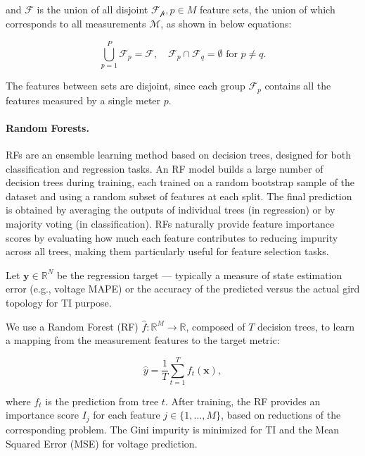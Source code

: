 \documentclass[journal]{IEEEtran}  %
\begin{document}
and $\mathcal{F}$ is the union of all disjoint $\mathcal{F_p}, p \in M$ feature sets, the union of which corresponds to all measurements $\mathcal{M}$, as shown in below equations:

\begin{equation}
\label{eq:Union of Feature Groups}
\bigcup_{p=1}^P \mathcal{F}_p = \mathcal{F}, \quad \mathcal{F}_p \cap \mathcal{F}_q = \emptyset \text{ for } p \neq q.
\end{equation}


The features between sets are disjoint, since each group $\mathcal{F}_p$ contains all the features measured by a single meter $p$.

\paragraph{Random Forests.}

RFs are an ensemble learning method based on decision trees, designed for both classification and regression tasks. An RF model builds a large number of decision trees during training, each trained on a random bootstrap sample of the dataset and using a random subset of features at each split. The final prediction is obtained by averaging the outputs of individual trees (in regression) or by majority voting (in classification). RFs naturally provide feature importance scores by evaluating how much each feature contributes to reducing impurity across all trees, making them particularly useful for feature selection tasks.

Let $\mathbf{y} \in \mathbb{R}^N$ be the regression target — typically a measure of state estimation error (e.g., voltage MAPE) or the accuracy of the predicted versus the actual gird topology for TI purpose.

We use a Random Forest (RF) $\hat{f}: \mathbb{R}^M \rightarrow \mathbb{R}$, composed of $T$ decision trees, to learn a mapping from the measurement features to the target metric:

\begin{equation}
\label{eq:Ensamble Prediction}
\hat{y} = \frac{1}{T} \sum_{t=1}^{T} f_t(\mathbf{x}),
\end{equation}

where $f_t$ is the prediction from tree $t$. After training, the RF provides an importance score $I_j$ for each feature $j \in \{1, \ldots, M\}$, based on reductions of the corresponding problem. The Gini impurity is minimized for TI and the Mean Squared Error (MSE) for voltage prediction.
\end{document}
